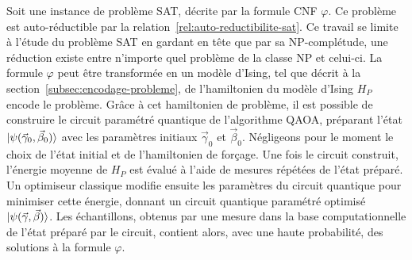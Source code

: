Soit une instance de problème SAT, décrite par la formule CNF $\varphi$. Ce problème est auto-réductible par la relation~\ref{rel:auto-reductibilite-sat}. Ce travail se limite à l'étude du problème SAT en gardant en tête que par sa \textsf{NP}-complétude, une réduction existe entre n'importe quel problème de la classe \textsf{NP} et celui-ci. La formule $\varphi$ peut être transformée en un modèle d'Ising, tel que décrit à la section~\ref{subsec:encodage-probleme}, de l'hamiltonien du modèle d'Ising $H_{P}$ encode le problème. Grâce à cet hamiltonien de problème, il est possible de construire le circuit paramétré quantique de l'algorithme QAOA, préparant l'état $\ket{\psi(\vec{\gamma}_{0}, \vec{\beta}_{0})}$ avec les paramètres initiaux $\vec{\gamma}_0$ et $\vec{\beta}_{0}$. Négligeons pour le moment le choix de l'état initial et de l'hamiltonien de forçage. Une fois le circuit construit, l'énergie moyenne de $H_{P}$ est évalué à l'aide de mesures répétées de l'état préparé. Un optimiseur classique modifie ensuite les paramètres du circuit quantique pour minimiser cette énergie, donnant un circuit quantique paramétré optimisé $\ket{\psi(\vec{\gamma}, \vec{\beta})}$.
Les échantillons, obtenus par une mesure dans la base computationnelle de l'état préparé par le circuit, contient alors, avec une haute probabilité, des solutions à la formule $\varphi$.

